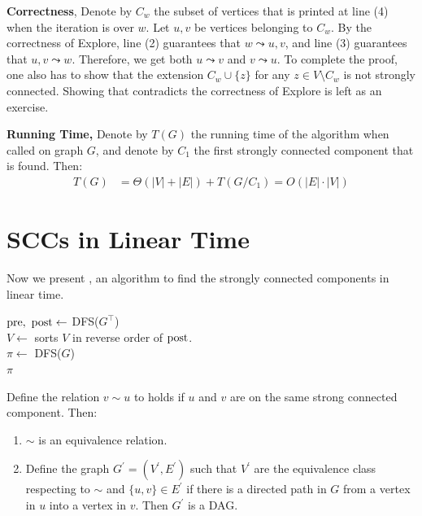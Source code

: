   \textbf{Correctness}, Denote by $C_{w}$ the subset of vertices that is printed at line (4) when the iteration is over $w$. Let $u, v$ be vertices belonging to $C_{w}$. By the correctness of Explore, line (2) guarantees that $w \leadsto u, v$, and line (3) guarantees that $u, v \leadsto w$. Therefore, we get both $u \leadsto v$ and $v \leadsto u$. To complete the proof, one also has to show that the extension $C_{w} \cup \{z\}$ for any $z \in V \setminus C_{w}$ is not strongly connected. Showing that contradicts the correctness of Explore is left as an exercise.

  \textbf{Running Time,} Denote by $T(G)$ the running time of the algorithm when called on graph $G$, and denote by $C_{1}$ the first strongly connected component that is found. Then:
   \begin{equation*}
    \begin{split}
      T(G) &= \Theta(|V| + |E|) + T(G/C_{1}) = O(|E| \cdot |V|)
    \end{split}
  \end{equation*}

  \section{SCCs in Linear Time}
Now we present , an algorithm to find the strongly connected components in linear time.
  \begin{algorithm}[h]
    $\text{pre}, \ \text{post} \leftarrow $ DFS($G^{\top}$) \\
    $V \leftarrow$ sorts $V$ in reverse order of $\text{post}$. \\
    $ \pi \leftarrow $ DFS($G$) \\
    \Return $\pi$ 
    \caption{Find SCCs fast version.}
    \label{alg:scc_fast}
  \end{algorithm}

\begin{claim}
  \label{claim:toDag}
  Define the relation $v\sim u$ to holds if $u$ and $v$ are on the same strong connected component. Then:\begin{enumerate}
    \item $\sim$ is an equivalence relation. 
    \item Define the graph $G^{\prime}=(V^\prime, E^\prime)$ such that $V^{\prime}$ are the equivalence class respecting to $\sim$ and $\{u,v\} \in E^{\prime}$ if there is a directed path in $G$ from a vertex in $u$ into a vertex in $v$. Then $G^{\prime}$ is a DAG.  
  \end{enumerate}
\end{claim}

